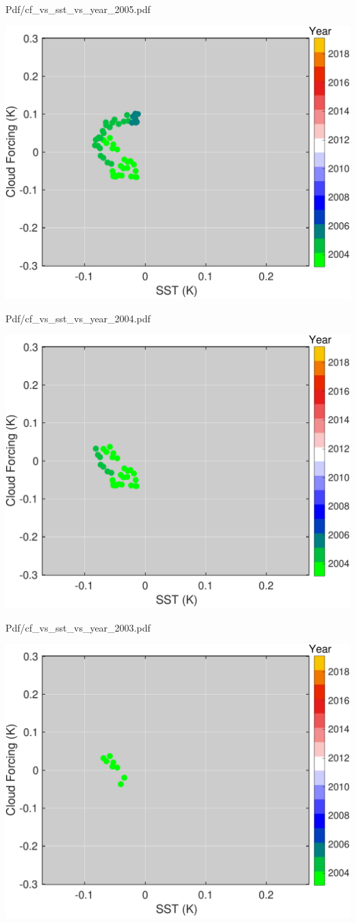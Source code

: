\documentclass[presentation]{beamer}
\begin{document}
\begin{frame}[label={sec:org9472fd3}]{Pdf/cf\_vs\_sst\_vs\_year\_2005.pdf}
\begin{center}
\includegraphics[width=0.7\linewidth]{./Figs/Pdf/cf_vs_sst_vs_year_2005.pdf}
\end{center}
\end{frame}

\begin{frame}[label={sec:org80dae69}]{Pdf/cf\_vs\_sst\_vs\_year\_2004.pdf}
\begin{center}
\includegraphics[width=0.7\linewidth]{./Figs/Pdf/cf_vs_sst_vs_year_2004.pdf}
\end{center}
\end{frame}

\begin{frame}[label={sec:org2ec9343}]{Pdf/cf\_vs\_sst\_vs\_year\_2003.pdf}
\begin{center}
\includegraphics[width=0.7\linewidth]{./Figs/Pdf/cf_vs_sst_vs_year_2003.pdf}
\end{center}
\end{frame}
\end{document}
